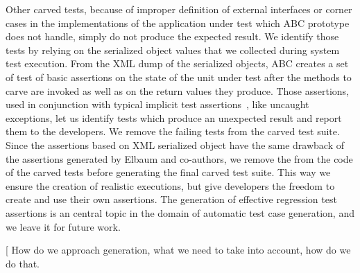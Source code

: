 \documentclass[10pt,conference]{IEEEtran}
\makeatletter
\gdef\xxx{\@ifnextchar[\xxx@lab\xxx@nolab}
\newcommand{\abc}{\textsf{ABC}\xspace}
\makeatother
\begin{document}
Other carved tests, because of improper definition of external interfaces or corner cases in the implementations of the application under test which \abc prototype does not handle, simply do not produce the expected result. 
We identify those tests by relying on the serialized object values that we collected during system test execution. From the XML dump of the serialized objects, \abc creates a set of test of basic assertions on the state of the unit under test after the methods to carve are invoked as well as on the return values they produce.
Those assertions, used in conjunction with typical implicit test assertions~\cite{randoop}, like uncaught exceptions, let us identify
 tests which produce an unexpected result and report them to the developers. We remove the failing tests from the carved test suite.
Since the assertions based on XML serialized object have the same drawback of the assertions generated by Elbaum and co-authors,
we remove the from the code of the carved tests before generating the final carved test suite. This way we ensure the creation of realistic executions, but give developers the freedom to create and use their own assertions. The generation of effective regression test assertions is an central topic in the domain of automatic test case generation, and we leave it for future work.

\xxx{Test Generation}
How do we approach generation, what we need to take into account, how do we do that.

\end{document}
